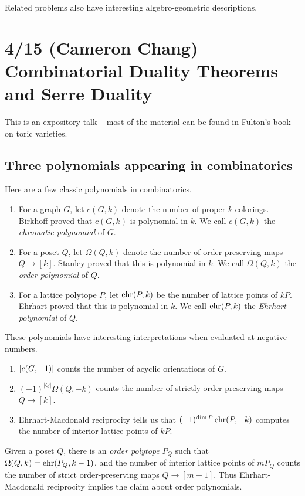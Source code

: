 \documentclass{article}
\begin{document}
Related problems also have interesting algebro-geometric descriptions.

\section{4/15 (Cameron Chang) -- Combinatorial Duality Theorems and Serre Duality}

This is an expository talk -- most of the material can be found in Fulton's book on toric varieties.

\subsection{Three polynomials appearing in combinatorics}

Here are a few classic polynomials in combinatorics.
\begin{enumerate}
	\item For a graph $G$, let $c(G, k)$ denote the number of proper $k$-colorings.
		Birkhoff proved that $c(G, k)$ is polynomial in $k$.
		We call $c(G, k)$ the \emph{chromatic polynomial} of $G$.
	\item For a poset $Q$, let $\Omega(Q, k)$ denote the number of order-preserving maps $Q \to [k]$.
		Stanley proved that this is polynomial in $k$.
		We call $\Omega(Q, k)$ the \emph{order polynomial} of $Q$.
	\item For a lattice polytope $P$, let $\operatorname{ehr}(P, k)$ be the number of lattice points of $kP$.
		Ehrhart proved that this is polynomial in $k$.
		We call $\operatorname{ehr}(P, k)$ the \emph{Ehrhart polynomial} of $Q$.
\end{enumerate}

These polynomials have interesting interpretations when evaluated at negative numbers.
\begin{enumerate}
	\item $\left|{c(G, -1)}\right|$ counts the number of acyclic orientations of $G$.
	\item $(-1)^{|Q|} \Omega(Q, -k)$ counts the number of strictly order-preserving maps $Q \to [k]$.
	\item Ehrhart-Macdonald reciprocity tells us that $(-1)^{\dim P} \operatorname{ehr}(P, -k)$ computes the number of interior lattice points of $k P$.
\end{enumerate}

Given a poset $Q$, there is an \emph{order polytope} $P_Q$ such that $\Omega(Q, k) = \operatorname{ehr}(P_Q, k-1)$, and the number of interior lattice points of $m P_Q$ counts the number of strict order-preserving maps $Q \to [m - 1]$.
Thus Ehrhart-Macdonald reciprocity implies the claim about order polynomials.
\end{document}
